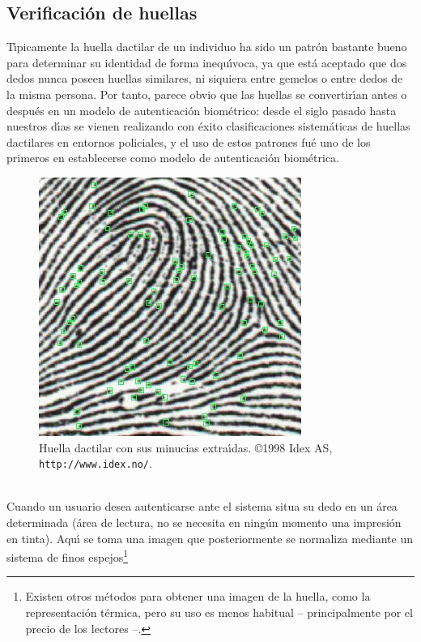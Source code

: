 \subsection{Verificaci\'on de huellas}  
T\'{\i}picamente la huella dactilar de un individuo ha sido un patr\'on bastante
bueno para determinar su identidad de forma inequ\'{\i}voca, ya que est\'a
aceptado que dos dedos nunca poseen huellas similares, ni siquiera entre 
gemelos o
entre dedos de la misma persona. Por tanto, parece obvio que las huellas
se convertir\'{\i}an antes o despu\'es en un modelo de autenticaci\'on 
biom\'etrico: desde el siglo pasado hasta nuestros d\'{\i}as se vienen 
realizando con \'exito clasificaciones sistem\'aticas de huellas dactilares en 
entornos policiales, y el uso de estos patrones fu\'e uno de los primeros en
establecerse como modelo de autenticaci\'on biom\'etrica.\\
\begin{figure}[t]
\begin{center}
\includegraphics{fingerprint.png}
\end{center}
\caption{Huella dactilar con sus minucias extra\'{\i}das. \copyright 1998 Idex 
AS, {\tt http://www.idex.no/}.}
\label{fingerprint}
\end{figure}
\\Cuando un usuario desea autenticarse ante el sistema situa su dedo en un 
\'area determinada (\'area de lectura, no se necesita en ning\'un momento una 
impresi\'on en tinta). Aqu\'{\i} se toma una imagen que posteriormente se 
normaliza mediante un sistema de finos espejos\footnote{Existen otros m\'etodos
para obtener una imagen de la huella, como la representaci\'on t\'ermica, pero 
su uso es menos habitual -- principalmente por el precio de los lectores --.} 
